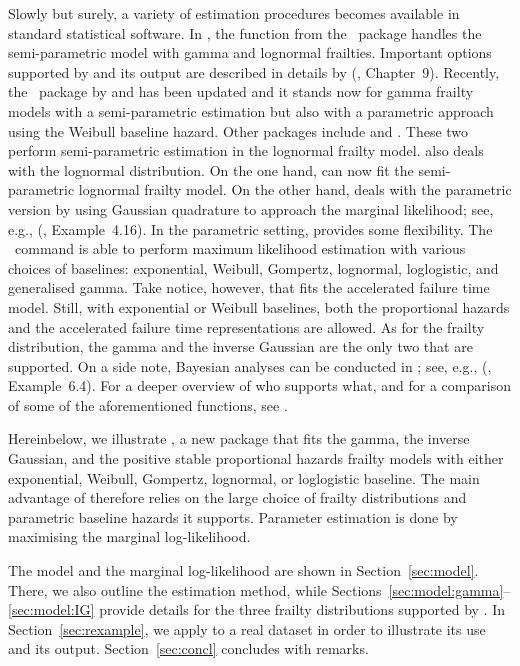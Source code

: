 Slowly but surely, a variety of estimation procedures becomes available in standard statistical software.
In  \citep{R}, the  function from the ~package \citep{R:survival}
  handles the semi-parametric model with gamma and lognormal frailties.
Important options supported by  and its output are described in details by 
  \citeauthor{TherneauGrambsch00} (\citeyear{TherneauGrambsch00}, Chapter~9).
Recently, the ~package \citep{R:frailtypack} by \cite{RondeauGonzales05}
  and \cite{RondeauEtal12} has been updated and it stands now for gamma frailty models
  with a semi-parametric estimation but also with a parametric approach using the Weibull baseline hazard.
Other  packages include  \citep{R:coxme} and  \citep{R:phmm}. 
These two perform semi-parametric estimation in the lognormal frailty model.
 \citep{SAS} also deals with the lognormal distribution. 
On the one hand,  can now fit the semi-parametric lognormal frailty model.
On the other hand,  deals with the parametric version by using Gaussian quadrature to approach the marginal likelihood;
  see, e.g., \citeauthor{DuchateauJanssen08} (\citeyear{DuchateauJanssen08}, Example~4.16).
In the parametric setting,  \citep{STATA} provides some flexibility.
The ~command \citep{Gutierrez02} is able to perform maximum likelihood estimation 
  with various choices of baselines:
  exponential, Weibull, Gompertz, lognormal, loglogistic, and generalised gamma.
Take notice, however, that  fits the accelerated failure time model.
Still, with exponential or Weibull baselines, both the proportional hazards and the accelerated failure time
  representations are allowed.   
As for the frailty distribution, the gamma and the inverse Gaussian are the only two that are supported.
On a side note, Bayesian analyses can be conducted in  \citep{Winbugs};
  see, e.g., \citeauthor{DuchateauJanssen08} (\citeyear{DuchateauJanssen08}, Example~6.4).
For a deeper overview of who supports what, and for a comparison of some of the aforementioned functions,
  see \cite{WienkeHirsch11}.


Hereinbelow, we illustrate  \citep{R:parfm}, a new  package that fits the gamma, the inverse Gaussian, and the positive stable proportional hazards frailty models 
  with either exponential, Weibull, Gompertz, lognormal, or loglogistic baseline.
The main advantage of  therefore relies on the large choice 
  of frailty distributions and parametric baseline hazards it supports.
Parameter estimation is done by maximising the marginal log-likelihood.

The model and the marginal log-likelihood are shown in Section~\ref{sec:model}.
There, we also outline the estimation method,
  while Sections~\ref{sec:model:gamma}--\ref{sec:model:IG} provide details 
  for the three frailty distributions supported by .
In Section~\ref{sec:rexample}, we apply  to a real dataset in order to illustrate its use and its output.
Section~\ref{sec:concl} concludes with remarks.
